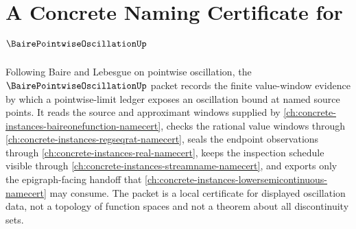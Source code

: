 \chapter{A Concrete Naming Certificate for $\BairePointwiseOscillationUp$}
\label{ch:concrete-instances-baire-pointwise-oscillation-namecert}

Following Baire and Lebesgue on pointwise oscillation, the $\BairePointwiseOscillationUp$ packet records the finite value-window evidence by which a pointwise-limit ledger exposes an oscillation bound at named source points. It reads the source and approximant windows supplied by \autoref{ch:concrete-instances-baireonefunction-namecert}, checks the rational value windows through \autoref{ch:concrete-instances-regseqrat-namecert}, seals the endpoint observations through \autoref{ch:concrete-instances-real-namecert}, keeps the inspection schedule visible through \autoref{ch:concrete-instances-streamname-namecert}, and exports only the epigraph-facing handoff that \autoref{ch:concrete-instances-lowersemicontinuous-namecert} may consume. The packet is a local certificate for displayed oscillation data, not a topology of function spaces and not a theorem about all discontinuity sets.

